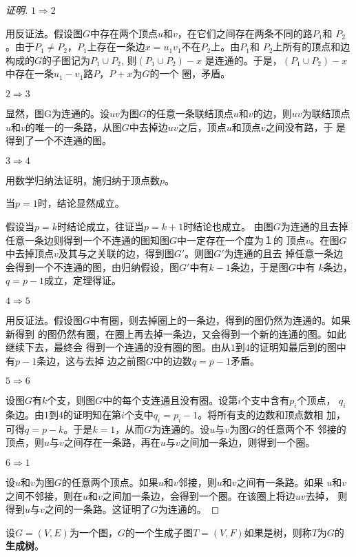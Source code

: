   \begin{proof}[证明]

    $1\Rightarrow2$

    用反证法。假设图$G$中存在两个顶点$u$和$v$，在它们之间存在两条不同的路$P_1$和
    $P_2$。由于$P_1\neq P_2$，$P_1$上存在一条边$x=u_1v_1$不在$P_2$上。由$P_1$和
    $P_2$上所有的顶点和边构成的$G$的子图记为$P_1\cup P_2$, 则$(P_1\cup P_2)- x$
    是连通的。于是，$(P_1\cup P_2)-x$中存在一条$u_1-v_1$路$P$，$P+x$为$G$的一个
    圈，矛盾。

    $2\Rightarrow3$

显然，图G为连通的。设$uv$为图$G$的任意一条联结顶点$u$和$v$的边，则$uv$为联结顶点
$u$和$v$的唯一的一条路，从图$G$中去掉边$uv$之后，顶点$u$和顶点$v$之间没有路，于
是得到了一个不连通的图。

$3\Rightarrow 4$

用数学归纳法证明，施归纳于顶点数$p$。

当$p=1$时，结论显然成立。

假设当$p=k$时结论成立，往证当$p=k+1$时结论也成立。
由图$G$为连通的且去掉任意一条边则得到一个不连通的图知图$G$中一定存在一个度为１的
顶点$v$。在图$G$中去掉顶点$v$及其与之关联的边，得到图$G'$。则图$G'$为连通的且去
掉任意一条边会得到一个不连通的图，由归纳假设，图$G'$中有$k-1$条边，于是图$G$中有
$k$条边，$q=p-1$成立，定理得证。

$4\Rightarrow 5$

用反证法。假设图$G$中有圈，则去掉圈上的一条边，得到的图仍然为连通的。如果新得到
的图仍然有圈，在圈上再去掉一条边，又会得到一个新的连通的图。如此继续下去，最终会
得到一个连通的没有圈的图。由从$1$到$4$的证明知最后到的图中有$p-1$条边，这与去掉
边之前图$G$中的边数$q=p-1$矛盾。

$5\Rightarrow 6$

设图$G$有$k$个支，则图$G$中的每个支连通且没有圈。设第$i$个支中含有$p_i$个顶点，
$q_i$条边。由$1$到$4$的证明知在第$i$个支中$q_i=p_i-1$。将所有支的边数和顶点数相
加，可得$q = p-k$。于是$k=1$，从而$G$为连通的。设$u$与$v$为图$G$的任意两个不
邻接的顶点，则$u$与$v$之间存在一条路，再在$u$与$v$之间加一条边，则得到一个圈。

$6\Rightarrow 1$

设$u$和$v$为图$G$的任意两个顶点。如果$u$和$v$邻接，则$u$和$v$之间有一条路。如果
$u$和$v$之间不邻接，则在$u$和$v$之间加一条边，会得到一个圈。在该圈上将边$uv$去掉，
则得到$u$与$v$之间的一条路。这证明了$G$为连通的。
\end{proof}
  \begin{Def}
    设$G=(V,E)$为一个图，$G$的一个生成子图$T=(V,F)$如果是树，则称$T$为$G$的{\bfseries 生成树}。
  \end{Def}
